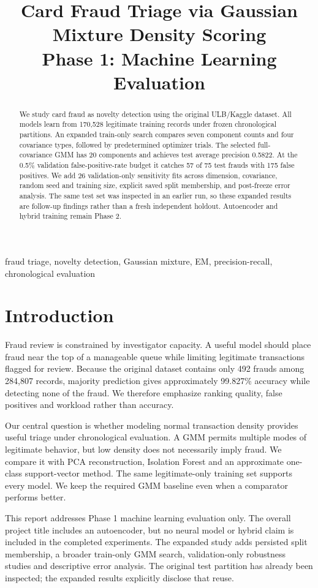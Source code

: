 \documentclass[conference]{IEEEtran}
\title{Card Fraud Triage via Gaussian Mixture Density Scoring\\Phase 1: Machine Learning Evaluation}
\author{\IEEEauthorblockN{Bhumi Rastogi, Aaditya Yadav, Farhana Pervin, Anshvardhan Badkur, Gauri mishra}
\IEEEauthorblockA{Team T085, Section E, Project 26\\Rishihood University\\2401010129, 2401010004, 2401010164, 2401010083, 2401020023}}
\begin{document}
\maketitle
\begin{abstract}
We study card fraud as novelty detection using the original ULB/Kaggle dataset. All models learn from 170,528 legitimate training records under frozen chronological partitions. An expanded train-only search compares seven component counts and four covariance types, followed by predetermined optimizer trials. The selected full-covariance GMM has 20 components and achieves test average precision 0.5822. At the 0.5\% validation false-positive-rate budget it catches 57 of 75 test frauds with 175 false positives. We add 26 validation-only sensitivity fits across dimension, covariance, random seed and training size, explicit saved split membership, and post-freeze error analysis. The same test set was inspected in an earlier run, so these expanded results are follow-up findings rather than a fresh independent holdout. Autoencoder and hybrid training remain Phase 2.
\end{abstract}
\begin{IEEEkeywords}
fraud triage, novelty detection, Gaussian mixture, EM, precision-recall, chronological evaluation
\end{IEEEkeywords}

\section{Introduction}
Fraud review is constrained by investigator capacity. A useful model should place fraud near the top of a manageable queue while limiting legitimate transactions flagged for review. Because the original dataset contains only 492 frauds among 284,807 records, majority prediction gives approximately 99.827\% accuracy while detecting none of the fraud. We therefore emphasize ranking quality, false positives and workload rather than accuracy.

Our central question is whether modeling normal transaction density provides useful triage under chronological evaluation. A GMM permits multiple modes of legitimate behavior, but low density does not necessarily imply fraud. We compare it with PCA reconstruction, Isolation Forest and an approximate one-class support-vector method. The same legitimate-only training set supports every model. We keep the required GMM baseline even when a comparator performs better.

This report addresses Phase 1 machine learning evaluation only. The overall project title includes an autoencoder, but no neural model or hybrid claim is included in the completed experiments. The expanded study adds persisted split membership, a broader train-only GMM search, validation-only robustness studies and descriptive error analysis. The original test partition has already been inspected; the expanded results explicitly disclose that reuse.
\end{document}
